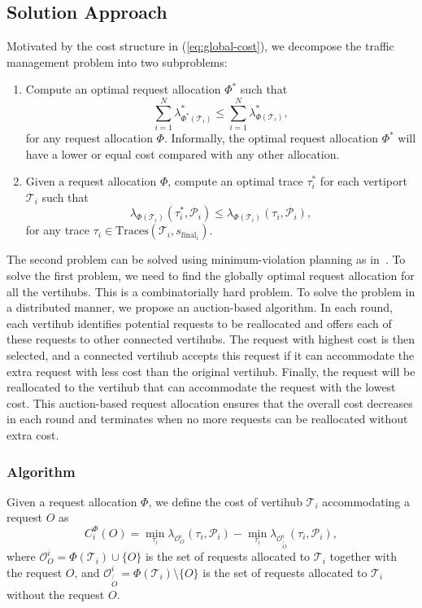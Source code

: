 \subsection{Solution Approach}

Motivated by the cost structure in (\ref{eq:global-cost}), we decompose the traffic management problem into two subproblems:
\begin{enumerate}
    \item Compute an optimal request allocation $\Phi^*$ such that
    \begin{equation*}
        \sum_{i=1}^N \lambda_{\Phi^*(\mathcal{T}_i)}^* \leq \sum_{i=1}^N \lambda_{\Phi(\mathcal{T}_i)}^*,
    \end{equation*}
    for any request allocation $\Phi$. Informally, the optimal request allocation $\Phi^{*}$ will have a lower or equal cost compared with any other allocation. 
    \item Given a request allocation $\Phi$, compute an optimal trace $\tau_i^*$ for each vertiport $\mathcal{T}_i$ such that
    \begin{equation*}
        \lambda_{\Phi(\mathcal{T}_i)}(\tau_i^*, \mathcal{P}_i) \leq \lambda_{\Phi(\mathcal{T}_i)}(\tau_i, \mathcal{P}_i),
    \end{equation*}
    for any trace $\tau_i \in \text{Traces}(\mathcal{T}_i,s_{\text{final}_i})$.
\end{enumerate}
The second problem can be solved using minimum-violation planning as in~\cite{Tumova:2013:ACC,Tumova:2013:LCS}.
To solve the first problem, we need to find the globally optimal request allocation for all the vertihubs. This is a combinatorially hard problem. To solve the problem in a distributed manner, we propose an auction-based algorithm. In each round, each vertihub identifies potential requests to be reallocated and offers each of these requests to other connected vertihubs.  The request with highest cost is then selected, and a connected vertihub accepts this request if it can accommodate the extra request with less cost than the original vertihub. Finally, the request will be reallocated to the vertihub that can accommodate the request with the lowest cost. This auction-based request allocation ensures that the overall cost decreases in each round and terminates when no more requests can be reallocated without extra cost.

\subsubsection{Algorithm} 
Given a request allocation $\Phi$, we define the cost of vertihub $\mathcal{T}_i$ accommodating a request $O$ as
\begin{equation}
    C_i^\Phi(O) = \min_{\tau_i} \lambda_{\mathcal{O}^i_O}(\tau_i, \mathcal{P}_i) - \min_{\tau_i} \lambda_{\mathcal{O}^i_{\not{O}}}(\tau_i, \mathcal{P}_i),
\end{equation}
where $\mathcal{O}^i_O = \Phi(\mathcal{T}_i) \cup \{O\}$ is the set of requests allocated to $\mathcal{T}_i$ together with the request $O$, and $\mathcal{O}^i_{\not{O}} = \Phi(\mathcal{T}_i) \setminus \{O\}$ is the set of requests allocated to $\mathcal{T}_i$ without the request $O$.

